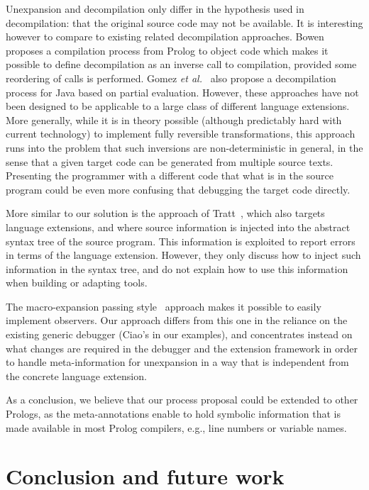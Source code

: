 \documentclass[preprint]{llncs}
\begin{document}
Unexpansion and decompilation only differ in the hypothesis used in
decompilation: that the original source code may not be available. It
is interesting however to compare to existing related decompilation
approaches. Bowen~\cite{decompilationprolog} proposes a compilation
process from Prolog to object code which makes it possible to define
decompilation as an inverse call to compilation, provided some
reordering of calls is performed. Gomez \emph{et
  al.}~\cite{mod-decomp-jist09} also propose a decompilation process for
Java based on partial evaluation. However, these approaches have not
been designed to be applicable to a large class of different language
extensions.  More generally, while it is in theory possible (although
predictably hard with current technology) to implement fully
reversible transformations, this approach runs into the problem that
such inversions are non-deterministic in general, in the sense that a
given target code can be generated from multiple source texts.
Presenting the programmer with a different code that what is in the
source program could be even more confusing that debugging the target
code directly.

More similar to our solution is the approach of Tratt~\cite{tratt08},
which also targets language extensions, and where source information
is injected into the abstract syntax tree of the source program. This
information is exploited to report errors in terms of the language
extension. However, they only discuss how to inject such information
in the syntax tree, and do not explain how to use this information
when building or adapting tools.

The macro-expansion passing style~\cite{dybvigEPS} approach makes it
possible to easily implement observers. Our approach differs from this
one in the reliance on the existing generic debugger (Ciao's in our
examples), and concentrates instead on what changes are required in
the debugger and the extension framework in order to handle
meta-information for unexpansion in a way that is independent from
the concrete language extension.

As a conclusion, we believe that our process proposal could be
extended to other Prologs, as the meta-annotations enable to
hold symbolic information that is made available in most Prolog compilers,
e.g., line numbers or variable names.



\section{Conclusion and future work}
\label{sec:conclusions}
\end{document}
